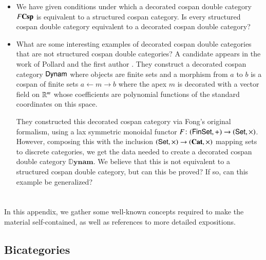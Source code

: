 \documentclass[reqno]{amsart}
\begin{document}
\begin{itemize}
\item We have given conditions under which a decorated cospan double category $F \mathbf{Csp}$ is
equivalent to a structured cospan category.    Is every structured cospan double category 
equivalent to a decorated cospan double category?
\item What are some interesting examples of decorated cospan double categories that are not structured cospan double categories?   A candidate appears in the work of Pollard and the first author \cite{BP}.  They construct a decorated cospan category $\mathsf{Dynam}$ where objects are finite sets and a morphism from $a$ to $b$ is a cospan of finite sets $a \leftarrow m \rightarrow b$ where the apex $m$ is decorated with a vector field on $\mathbb{R}^m$ whose coefficients are polynomial functions of the standard coordinates on this space.

They constructed this decorated cospan category via Fong's original formalism, using a lax symmetric monoidal functor $F \colon (\mathsf{Fin}\mathsf{Set}, +) \to (\mathsf{Set}, \times)$.  However, composing this with the inclusion $(\mathsf{Set}, \times) \to (\mathbf{Cat}, \times)$ mapping sets to discrete categories, we get the data needed to create a decorated cospan double category $\mathbb{D}\mathbf{ynam}$.   We believe that this is not equivalent to a structured cospan double category, but can this be proved?  If so, can this example be generalized?
\end{itemize}

\appendix

\section{}
In this appendix, we gather some well-known concepts required to make the material self-contained, as well as references to more detailed expositions.

\subsection{Bicategories}
\label{subsec:bicats}
\end{document}
